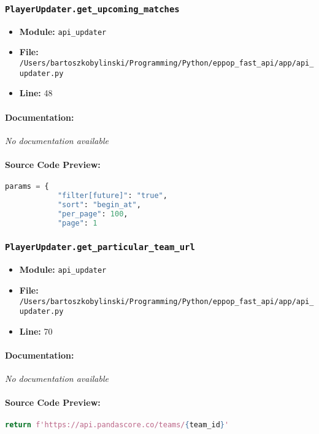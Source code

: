 \documentclass[11pt,a4paper]{article}
\begin{document}
\subsubsection{\texttt{PlayerUpdater.get\_upcoming\_matches}}

\begin{itemize}
    \item \textbf{Module:} \texttt{api\_updater}
    \item \textbf{File:} \texttt{/Users/bartoszkobylinski/Programming/Python/eppop\_fast\_api/app/api\_updater.py}
    \item \textbf{Line:} 48
\end{itemize}

\paragraph{Documentation:} \textit{No documentation available}

\paragraph{Source Code Preview:}
\begin{lstlisting}[language=Python]
        params = {
            "filter[future]": "true",
            "sort": "begin_at",
            "per_page": 100,
            "page": 1
\end{lstlisting}

\vspace{1em}
\subsubsection{\texttt{PlayerUpdater.get\_particular\_team\_url}}

\begin{itemize}
    \item \textbf{Module:} \texttt{api\_updater}
    \item \textbf{File:} \texttt{/Users/bartoszkobylinski/Programming/Python/eppop\_fast\_api/app/api\_updater.py}
    \item \textbf{Line:} 70
\end{itemize}

\paragraph{Documentation:} \textit{No documentation available}

\paragraph{Source Code Preview:}
\begin{lstlisting}[language=Python]
        return f'https://api.pandascore.co/teams/{team_id}'
\end{lstlisting}
\end{document}
